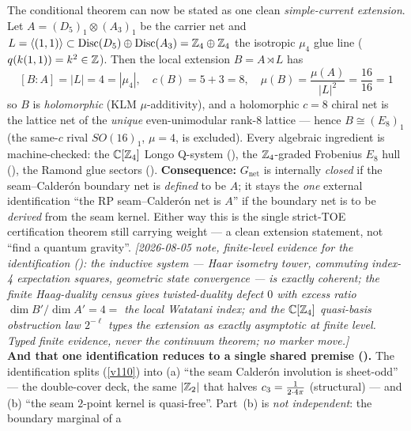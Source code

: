 \begin{keybox}
The conditional theorem can now be stated as one clean \emph{simple-current extension}. Let
$A=(D_5)_1\otimes(A_3)_1$ be the carrier net and $L=\langle(1,1)\rangle\subset\operatorname{Disc}(D_5)\oplus
\operatorname{Disc}(A_3)=\mathbb Z_4\oplus\mathbb Z_4$ the isotropic $\mu_4$ glue line ($q(k(1,1))=k^2\in\mathbb Z$). Then the
local extension $B=A\rtimes L$ has
\[
  \boxed{\ [B:A]=|L|=4=|\mu_4|,\quad c(B)=5{+}3=8,\quad \mu(B)=\frac{\mu(A)}{|L|^2}=\frac{16}{16}=1\ }
\]
so $B$ is \emph{holomorphic} (KLM $\mu$-additivity), and a holomorphic $c{=}8$ chiral net is the lattice net of
the \emph{unique} even-unimodular rank-$8$ lattice --- hence $\boxed{B\cong(E_8)_1}$ (the same-$c$ rival
$SO(16)_1$, $\mu{=}4$, is excluded). Every algebraic ingredient is machine-checked: the $\mathbb C[\mathbb Z_4]$ Longo
Q-system (), the $\mathbb Z_4$-graded Frobenius $E_8$ hull (),
the Ramond glue sectors (). \textbf{Consequence:} $G_{\mathrm{net}}$ is internally
\emph{closed} if the seam--Calder\'on boundary net is \emph{defined} to be $A$; it stays the \emph{one} external
identification ``the RP seam--Calder\'on net is $A$'' if the boundary net is to be \emph{derived} from the seam
kernel. Either way this is the single strict-TOE certification theorem still carrying weight --- a clean
extension statement, not ``find a quantum gravity''.
\emph{[2026-08-05 note, finite-level evidence for the identification
(): the inductive system --- Haar isometry tower, commuting index-4
expectation squares, geometric state convergence --- is exactly coherent; the finite Haag-duality census
gives twisted-duality defect $0$ with excess ratio $\dim B'/\dim A'=4=$ the local Watatani index; and the
$\mathbb C[\mathbb Z_4]$ quasi-basis obstruction law $2^{-\ell}$ types the extension as exactly asymptotic at
finite level.  Typed finite evidence, never the continuum theorem; no marker move.]}
\smallskip\\
\noindent\textbf{And that one identification reduces to a single shared premise ().}
The identification splits (\vref{v110}) into (a) ``the seam Calder\'on involution is sheet-odd'' --- the
double-cover deck, the same $|\mathbb Z_2|$ that halves $c_3=\tfrac1{2\cdot4\pi}$ (structural) --- and (b) ``the
seam $2$-point kernel is quasi-free''. Part~(b) is \emph{not independent}: the boundary marginal of a

\end{keybox}
